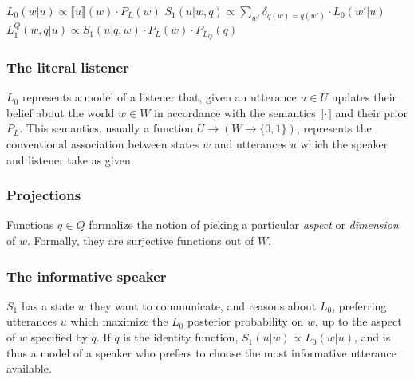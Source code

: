 \documentclass[OpenMind]{stjour}
\newcommand{\Listener}{L}
\newcommand{\QLONE}{\Listener_{{1}}^{{Q}}}
\begin{document}

	\begin{exe}
	\ex $L_0(w\vert u) \propto \llbracket u \rrbracket (w)\cdot P_L(w)$ \label{defl0}
	\ex $S_1(u\vert w,q) \propto \sum_{w'} \delta_{q(w)=q(w')} \cdot L_0(w'\vert u)$ \label{defs0}
	\ex $\QLONE(w,q\vert u) \propto S_1(u\vert q,w)\cdot P_L(w)\cdot P_{L_Q}(q)$ \label{defl1}
	\end{exe}

	\subsubsection{The literal listener} $L_0$ represents a model of a listener that, given an utterance $u\in U$ updates their belief about the world $w\in W$ in accordance with the semantics $\llbracket\cdot\rrbracket$ and their prior $P_L$. This semantics, usually a function $U\to(W\to\{0, 1\})$, represents the conventional association between states $w$ and utterances $u$ which the speaker and listener take as given. 



	\subsubsection{Projections} 
	Functions $q\in Q$ formalize the notion of picking a particular \emph{aspect} or \emph{dimension} of $w$. Formally, they are surjective functions out of $W$.
	

	\subsubsection{The informative speaker} $S_1$ has a state $w$ they want to communicate, and reasons about $L_0$, preferring utterances $u$ which maximize the $L_0$ posterior probability on $w$, up to the aspect of $w$ specified by $q$. If $q$ is the identity function, $S_1(u|w) \propto L_0(w|u)$, and is thus a model of a speaker who prefers to choose the most informative utterance available. 
	
\end{document}
